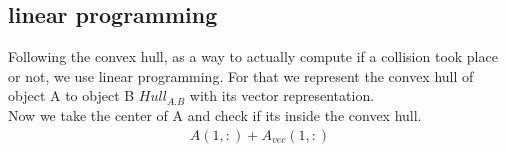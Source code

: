 \subsection{linear programming} %
Following the convex hull, as a way to actually compute if a collision took place or not, we use linear programming.
For that we represent the convex hull of object A to object B $Hull_{A.B}$ with its vector representation.\\
Now we take the center of A and check if its inside the convex hull.
\begin{align*}
A(1,:) + A_{vec}(1,:) 
\end{align*}


